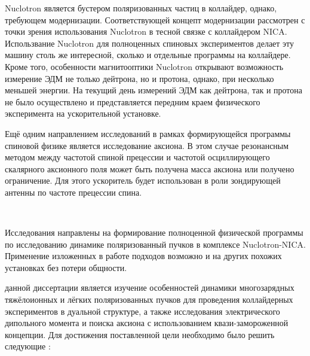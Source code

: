 \par Nuclotron является бустером поляризованных частиц в коллайдер, однако, требующем модернизации. Соответствующей концепт модернизации рассмотрен с точки зрения использования Nuclotron в тесной связке с коллайдером NICA.
Использвание Nuclotron для полноценных спиновых экспериментов делает эту машину столь же интересной, сколько и отдельные программы на коллайдере. 
Кроме того, особенности магнитооптики Nuclotron открывают возможность измерение ЭДМ не только дейтрона, но и протона, однако, при несколько меньшей энергии. На текущий день измерений ЭДМ как дейтрона, так и протона не было осуществлено и представляется передним краем физического эксперимента на ускорительной установке.

\par Ещё одним направлением исследований в рамках формирующейся программы спиновой физике является исследование аксиона. В этом случае резонансным методом между частотой спиной прецессии и частотой осциллирующего скалярного аксионного поля может быть получена масса аксиона или получено ограничение. Для этого ускоритель будет использован в роли зондирующей антенны по частоте прецессии спина.

~\\
\par {\actuality} Исследования направлены на формирование полноценной физической программы по исследованию  динамике поляризованный пучков в комплексе Nuclotron-NICA. Применение изложенных в работе подходов возможно и на других похожих установках без потери общности.
~\\
\par {\aim} данной диссертации является изучение особенностей динамики многозарядных тяжёлоионных и лёгких поляризованных пучков для проведения коллайдерных экспериментов в дуальной структуре, а также исследования электрического дипольного момента и поиска аксиона с использованием квази-замороженной концепции.
Для достижения поставленной цели необходимо было 
решить следующие {\tasks}:

